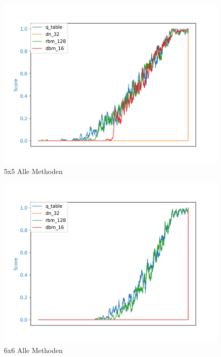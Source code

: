 \begin{figure}[H]
\centering
\includegraphics[width=\textwidth]{Figures/all_5x5_q_table_dn_32_rbm_128_dbm_16.png}
\caption{5x5 Alle Methoden}
\label{all_5}
\end{figure}

\begin{figure}[H]
\centering
\includegraphics[width=\textwidth]{Figures/all_6x6_q_table_dn_32_rbm_128_dbm_16.png}
\caption{6x6 Alle Methoden}
\label{all_6}
\end{figure}

